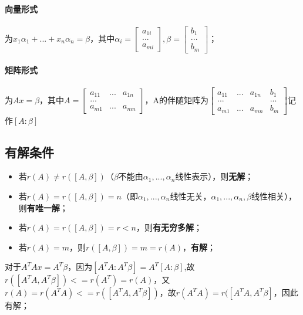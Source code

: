 \paragraph{向量形式}
为\(x_1\alpha_1 + ... + x_n\alpha_n = \beta\)，其中\(\alpha_i = \begin{bmatrix}
    a_{1i} \\ 
    ... \\ 
    a_{mi}
\end{bmatrix}, \beta = \begin{bmatrix}
    b_1 \\ 
    ... \\ 
    b_m
\end{bmatrix}\)；

\paragraph{矩阵形式}
为\(Ax = \beta\)，其中\(A = \begin{bmatrix}
    a_{11} & ... & a_{1n} \\ 
    ... \\ 
    a_{m1} & ... & a_{mn}
\end{bmatrix}\)，A的伴随矩阵为\(\begin{bmatrix}
    a_{11} & ... & a_{1n} & b_1 \\ 
    ... & & & ... \\ 
    a_{m1} & ... & a_{mn} & b_m
\end{bmatrix}\)记作\([A : \beta]\)

\subsection{有解条件}
\begin{itemize}
    \item 若\(r(A) \neq r([A, \beta])\)（\(\beta\)不能由\(\alpha_1, ..., \alpha_n\)线性表示），则\textbf{无解}；
    \item 若\(r(A) = r([A, \beta]) = n\)（即\(\alpha_1, ..., \alpha_n\)线性无关，\(\alpha_1, ..., \alpha_n, \beta\)线性相关），则\textbf{有唯一解}；
    \item 若\(r(A) = r([A, \beta]) = r < n\)，则\textbf{有无穷多解}；
    \item 若\(r(A) = m\)，则\(r([A, \beta]) = m = r(A)\)，\textbf{有解}；
\end{itemize}

对于\(A^TAx = A^T\beta\)，因为\([A^TA : A^T\beta] = A^T[A : \beta]\),故\(r([A^TA, A^T\beta]) <= r(A^T) = r(A)\)，又\(r(A) = r(A^TA) <= r([A^TA, A^T\beta])\)，故\(r(A^TA) = r([A^TA, A^T\beta]\)，因此有解；

